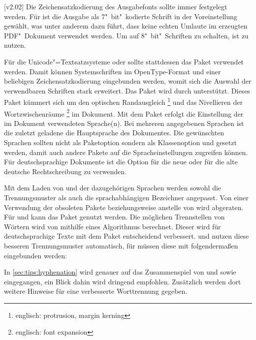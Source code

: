 \begin{DeclarePackages}
[v2.02]
  Die Zeichensatzkodierung des Ausgabefonts sollte immer festgelegt werden. Für 
   ist die Ausgabe als 7"~bit"~kodierte Schrift in der 
  Voreinstellung gewählt, was unter anderem dazu führt, dass keine echten
  Umlaute im erzeugten PDF"~Dokument verwendet werden. Um auf 8"~bit"~Schriften
  zu schalten, ist  zu
  nutzen.
  
  Für die Unicode"=Textsatzsysteme  oder  
  sollte stattdessen das Paket  verwendet werden. Damit 
  können Systemschriften im OpenType-Format und einer beliebigen 
  Zeichensatzkodierung eingebunden werden, womit sich die Auswahl der 
  verwendbaren Schriften stark erweitert. Das Paket wird durch \TUDScript 
  unterstützt.
  Dieses Paket kümmert sich um den optischen Randausgleich%
  \footnote{englisch: protrusion, margin kerning}
  und das Nivellieren der Wortzwischenräume%
  \footnote{englisch: font expansion}
  im Dokument.
  Mit dem Paket  erfolgt die Einstellung der im Dokument 
  verwendeten Sprache(n). Bei mehreren angegebenen Sprachen ist die zuletzt 
  geladene die Hauptsprache des Dokumentes. Die gewünschten Sprachen sollten 
  nicht als Paketoption sondern als Klassenoption und gesetzt werden, damit 
  auch andere Pakete auf die Spracheinstellungen zugreifen können. Für 
  deutschsprachige Dokumente ist die Option  für die neue oder 
   für die alte deutsche Rechtschreibung zu verwenden. 
  
  Mit dem Laden von  und der dazugehörigen Sprachen werden 
  sowohl die Trennungsmuster als auch die sprachabhängigen Bezeichner angepasst.
  Von einer Verwendung der obsoleten Pakete  beziehungsweise 
   anstelle von  wird abgeraten. Für 
   und  kann das Paket  
  genutzt werden.
  Die möglichen Trennstellen von Wörtern wird von  mithilfe 
  eines Algorithmus berechnet. Dieser wird für deutschsprachige Texte mit dem 
  Paket  entscheidend verbessert.  und 
   nutzen diese besseren Trennungsmuster automatisch, für 
   müssen diese mit folgendermaßen eingebunden werden:
  \begin{Code}
    \usepackage[ngerman=ngerman-x-latest]{hyphsubst}
  \end{Code}\vspace{-\baselineskip}%
  In \autoref{sec:tips:hyphenation} wird genauer auf das Zusammenspiel von 
   und  sowie  eingegangen, 
  ein Blick dahin wird dringend empfohlen. Zusätzlich werden dort weitere 
  Hinweise für eine verbesserte Worttrennung gegeben.
\end{DeclarePackages}
